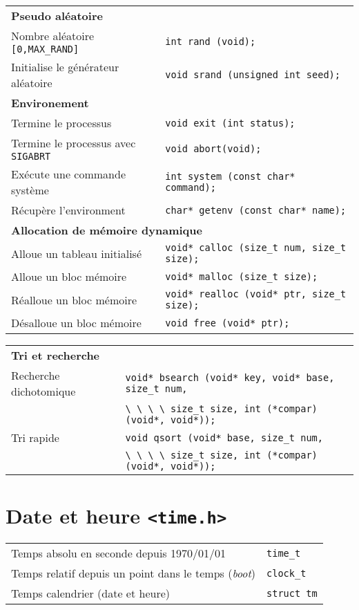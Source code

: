 \documentclass{article}
\newcommand{\cd}{\lstinline}
\begin{document}
\begin{multicols*}{3}
\begin{tabularx}{\linewidth}{Xl}
  \multicolumn{2}{l}{\bf Pseudo aléatoire} \rule{0pt}{3ex}\\
  Nombre aléatoire \cd{[0,MAX_RAND]} & \cd{int rand (void);} \\
  Initialise le générateur aléatoire & \cd{void srand (unsigned int seed);} \\

  \multicolumn{2}{l}{\bf Environement} \rule{0pt}{3ex}\\
  Termine le processus & \cd{void exit (int status);} \\
  Termine le processus avec \cd{SIGABRT} & \cd{void abort(void);} \\
  Exécute une commande système & \cd{int system (const char* command);} \\
  Récupère l'environment & \cd{char* getenv (const char* name);} \\

  \multicolumn{2}{l}{\bf Allocation de mémoire dynamique} \rule{0pt}{3ex} \\
  Alloue un tableau initialisé & \cd{void* calloc (size_t num, size_t size);} \\
  Alloue un bloc mémoire & \cd{void* malloc (size_t size);} \\
  Réalloue un bloc mémoire & \cd{void* realloc (void* ptr, size_t size);} \\
  Désalloue un bloc mémoire & \cd{void free (void* ptr);} \\
\end{tabularx}
\begin{tabularx}{\linewidth}{Xl}
  \multicolumn{2}{l}{\bf Tri et recherche} \rule{0pt}{3ex} \\
  Recherche dichotomique & \cd{void* bsearch (void* key, void* base, size_t num,} \\
                         & \cd{\ \ \ \ size_t size, int (*compar)(void*, void*));} \\
  Tri rapide             & \cd{void qsort (void* base, size_t num,} \\
                         & \cd{\ \ \ \ size_t size, int (*compar)(void*, void*));} \\
\end{tabularx}

\section*{Date et heure \texttt{<time.h>}}
\begin{tabularx}{\linewidth}{Xl}
  Temps absolu en seconde depuis 1970/01/01 & \cd{time_t} \\
  Temps relatif depuis un point dans le temps (\emph{boot}) & \cd{clock_t} \\
  Temps calendrier (date et heure) & \cd{struct tm} \\
\end{tabularx}


\end{multicols*}
\end{document}
